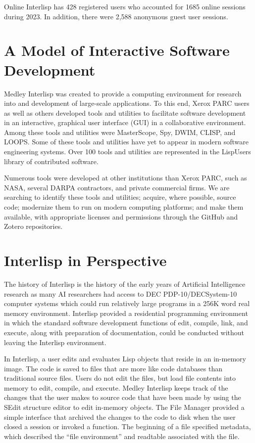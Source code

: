 \documentclass[sigconf]{acmart}
\begin{document}
Online Interlisp has 428 registered users who accounted for 1685 online sessions during 2023. In addition, there were 2,588 anonymous guest user sessions.

\section{A Model of Interactive Software Development}

Medley Interlisp was created to provide a computing environment for research into and development of large-scale applications. To this end, Xerox PARC users as well as others developed tools and utilities to facilitate software development in an interactive, graphical user interface (GUI) in a collaborative environment.\cite{Kaisler2021} Among these tools and utilities were MasterScope, Spy, DWIM, CLISP, and LOOPS. Some of these tools and utilities have yet to appear in modern software engineering systems. Over 100 tools and utilities are represented in the LispUsers library of contributed software.

Numerous tools were developed at other institutions than Xerox PARC, such as NASA, several DARPA contractors, and private commercial firms. We are searching to identify these tools and utilities; acquire, where possible, source code; modernize them to run on modern computing platforms; and make them available, with appropriate licenses and permissions through the GitHub and Zotero repositories.

\section{Interlisp in Perspective}

The history of Interlisp is the history of the early years of Artificial Intelligence research as many AI researchers had access to DEC PDP-10/DECSystem-10 computer systems which could run relatively large programs in a 256K word real memory environment\cite{Bobrow74}. Interlisp provided a residential programming environment in which the standard software development functions of edit, compile, link, and execute, along with preparation of documentation, could be conducted without leaving the Interlisp environment\cite{Teitelman73}.

In Interlisp, a user edits and evaluates Lisp objects that reside in an in-memory image. The code is saved to files that are more like code databases than traditional source files. Users do not edit the files, but load file contents into memory to edit, compile, and execute. Medley Interlisp keeps track of the changes that the user makes to source code that have been made by using the SEdit structure editor to edit in-memory objects. The File Manager provided a simple interface that archived the changes to the code to disk when the user closed a session or invoked a function. The beginning of a file specified metadata, which described the “file environment” and readtable associated with the file.
\end{document}
